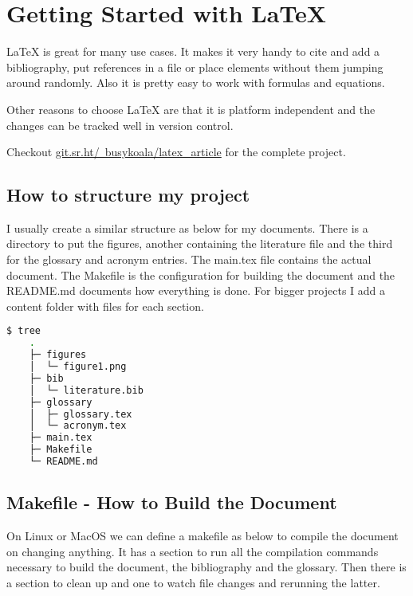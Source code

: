 \documentclass{article}
\begin{document}
  \section{Getting Started with LaTeX}

  LaTeX is great for many use cases. It makes it very handy to cite and add a
  bibliography, put references in a file or place elements without them jumping
  around randomly. Also it is pretty easy to work with formulas and equations.

  Other reasons to choose LaTeX are that it is platform independent and the
  changes can be tracked well in version control.

  Checkout \href{https://git.sr.ht/~busykoala/latex_article}{git.sr.ht/~busykoala/latex_article}
  for the complete project.

  \subsection{How to structure my project}

  I usually create a similar structure as below for my documents. There is a
  directory to put the figures, another containing the literature file and the
  third for the glossary and acronym entries.
  The main.tex file contains the actual document. The Makefile is the
  configuration for building the document and the README.md documents how
  everything is done. For bigger projects I add a content folder with files for
  each section.

  \begin{lstlisting}[language=Bash]
  $ tree
    .
    ├─ figures
    │  └─ figure1.png
    ├─ bib
    │  └─ literature.bib
    ├─ glossary
    │  ├─ glossary.tex
    │  └─ acronym.tex
    ├─ main.tex
    ├─ Makefile
    └─ README.md
  \end{lstlisting}

  \subsection{Makefile - How to Build the Document}

  On Linux or MacOS we can define a makefile as below to compile the document
  on changing anything. It has a section to run all the compilation commands
  necessary to build the document, the bibliography and the glossary. Then
  there is a section to clean up and one to watch file changes and rerunning
  the latter.
\end{document}
